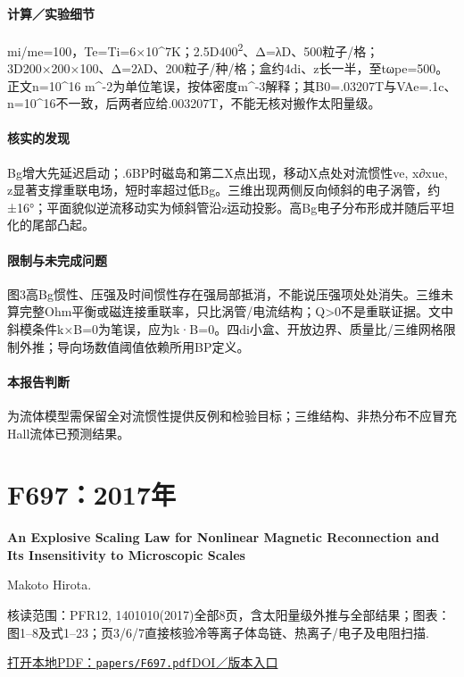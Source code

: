\paragraph{计算／实验细节}mi/me=100，Te=Ti=6×10\textasciicircum{}7K；2.5D400\textsuperscript{2}、Δ=λD、500粒子/格；3D200×200×100、Δ=2λD、200粒子/种/格；盒约4di、z长一半，至tωpe=500。正文n=10\textasciicircum{}16 m\textasciicircum{}-2为单位笔误，按体密度m\textasciicircum{}-3解释；其B0=.03207T与VAe=.1c、n=10\textasciicircum{}16不一致，后两者应给.003207T，不能无核对搬作太阳量级。

\paragraph{核实的发现}Bg增大先延迟启动；.6BP时磁岛和第二X点出现，移动X点处对流惯性ve, x∂xue, z显著支撑重联电场，短时率超过低Bg。三维出现两侧反向倾斜的电子涡管，约±16°；平面貌似逆流移动实为倾斜管沿z运动投影。高Bg电子分布形成并随后平坦化的尾部凸起。

\paragraph{限制与未完成问题}图3高Bg惯性、压强及时间惯性存在强局部抵消，不能说压强项处处消失。三维未算完整Ohm平衡或磁连接重联率，只比涡管/电流结构；Q>0不是重联证据。文中斜模条件k×B=0为笔误，应为k·B=0。四di小盒、开放边界、质量比/三维网格限制外推；导向场数值阈值依赖所用BP定义。

\paragraph{本报告判断}为流体模型需保留全对流惯性提供反例和检验目标；三维结构、非热分布不应冒充Hall流体已预测结果。

\section{F697：2017年}\label{paper:F697}

\textbf{An Explosive Scaling Law for Nonlinear Magnetic Reconnection and Its Insensitivity to Microscopic Scales}\citep{F697}\

Makoto Hirota.

\textsf{核读范围：}PFR12, 1401010(2017)全部8页，含太阳量级外推与全部结果；\textsf{图表：}图1–8及式1–23；页3/6/7直接核验冷等离子体岛链、热离子/电子及电阻扫描.

\href{run:papers/F697.pdf}{打开本地PDF：\texttt{papers/F697.pdf}}\quad\href{https://doi.org/10.1585/pfr.12.1401010}{DOI／版本入口}


